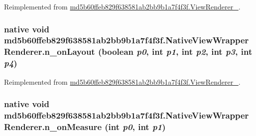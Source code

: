 Reimplemented from \hyperlink{classmd5b60ffeb829f638581ab2bb9b1a7f4f3f_1_1_view_renderer__2_dae20979ac761a65aa60c9b427509c37}{md5b60ffeb829f638581ab2bb9b1a7f4f3f.ViewRenderer\_}.\hypertarget{classmd5b60ffeb829f638581ab2bb9b1a7f4f3f_1_1_native_view_wrapper_renderer_7b65d0e1278ae3edf756f1f5dccf72fa}{
\subsubsection[{n\_\-onLayout}]{\setlength{\rightskip}{0pt plus 5cm}native void md5b60ffeb829f638581ab2bb9b1a7f4f3f.NativeViewWrapperRenderer.n\_\-onLayout (boolean {\em p0}, \/  int {\em p1}, \/  int {\em p2}, \/  int {\em p3}, \/  int {\em p4})}}
\label{classmd5b60ffeb829f638581ab2bb9b1a7f4f3f_1_1_native_view_wrapper_renderer_7b65d0e1278ae3edf756f1f5dccf72fa}




Reimplemented from \hyperlink{classmd5b60ffeb829f638581ab2bb9b1a7f4f3f_1_1_view_renderer__2_40c528ea52e22dd29fa541de43c0a010}{md5b60ffeb829f638581ab2bb9b1a7f4f3f.ViewRenderer\_}.\hypertarget{classmd5b60ffeb829f638581ab2bb9b1a7f4f3f_1_1_native_view_wrapper_renderer_582105ea43f5d7c863c98a959b8c698c}{
\subsubsection[{n\_\-onMeasure}]{\setlength{\rightskip}{0pt plus 5cm}native void md5b60ffeb829f638581ab2bb9b1a7f4f3f.NativeViewWrapperRenderer.n\_\-onMeasure (int {\em p0}, \/  int {\em p1})}}
\label{classmd5b60ffeb829f638581ab2bb9b1a7f4f3f_1_1_native_view_wrapper_renderer_582105ea43f5d7c863c98a959b8c698c}


